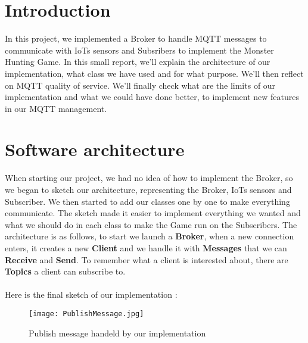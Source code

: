 \documentclass[12pt]{article}
\begin{document}
\thispagestyle{empty}
\tableofcontents
\pagebreak
\setcounter{page}{1}

\section{Introduction}
In this project, we implemented a Broker to handle MQTT messages to communicate with IoTs sensors 
and Subsribers to implement the Monster Hunting Game. In this small report, we'll explain the architecture of our implementation, 
what class we have used and for what purpose. We'll then reflect on MQTT quality of service. We'll finally check what are the limits of our implementation and what we could have done better, 
to implement new features in our MQTT management.

\section{Software architecture}
When starting our project, we had no idea of how to implement the Broker, so we began to sketch our architecture, representing the Broker, IoTs sensors and Subscriber. 
We then started to add our classes one by one to make everything communicate. The sketch made it easier to implement everything we wanted and what we should do in each class to make the Game run on the Subscribers. 
The architecture is as follows, to start we launch a \textbf{Broker}, when a new connection enters, it creates a new \textbf{Client} and we handle it 
with \textbf{Messages} that we can \textbf{Receive} and \textbf{Send}. To remember what a client is interested about, there are \textbf{Topics} a client 
can subscribe to.
\paragraph{}
Here is the final sketch of our implementation : 

\begin{figure}[!h]
	\centering
	\texttt{[image: PublishMessage.jpg]}
	\caption{Publish message handeld by our implementation}
\end{figure}
\end{document}
